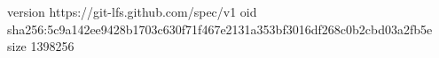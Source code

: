 version https://git-lfs.github.com/spec/v1
oid sha256:5c9a142ee9428b1703c630f71f467e2131a353bf3016df268c0b2cbd03a2fb5e
size 1398256
